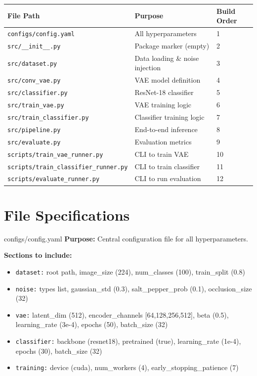 \documentclass[11pt,a4paper]{article}
\begin{document}
\begin{center}
\begin{tabular}{@{}lll@{}}
\toprule
\textbf{File Path} & \textbf{Purpose} & \textbf{Build Order} \\
\midrule
\texttt{configs/config.yaml} & All hyperparameters & 1 \\
\texttt{src/\_\_init\_\_.py} & Package marker (empty) & 2 \\
\texttt{src/dataset.py} & Data loading \& noise injection & 3 \\
\texttt{src/conv\_vae.py} & VAE model definition & 4 \\
\texttt{src/classifier.py} & ResNet-18 classifier & 5 \\
\texttt{src/train\_vae.py} & VAE training logic & 6 \\
\texttt{src/train\_classifier.py} & Classifier training logic & 7 \\
\texttt{src/pipeline.py} & End-to-end inference & 8 \\
\texttt{src/evaluate.py} & Evaluation metrics & 9 \\
\texttt{scripts/train\_vae\_runner.py} & CLI to train VAE & 10 \\
\texttt{scripts/train\_classifier\_runner.py} & CLI to train classifier & 11 \\
\texttt{scripts/evaluate\_runner.py} & CLI to run evaluation & 12 \\
\bottomrule
\end{tabular}
\end{center}

\newpage


\section{File Specifications}

\begin{filebox}{configs/config.yaml}
\textbf{Purpose:} Central configuration file for all hyperparameters.

\textbf{Sections to include:}
\begin{itemize}[noitemsep]
    \item \texttt{dataset:} root path, image\_size (224), num\_classes (100), train\_split (0.8)
    \item \texttt{noise:} types list, gaussian\_std (0.3), salt\_pepper\_prob (0.1), occlusion\_size (32)
    \item \texttt{vae:} latent\_dim (512), encoder\_channels [64,128,256,512], beta (0.5), learning\_rate (3e-4), epochs (50), batch\_size (32)
    \item \texttt{classifier:} backbone (resnet18), pretrained (true), learning\_rate (1e-4), epochs (30), batch\_size (32)
    \item \texttt{training:} device (cuda), num\_workers (4), early\_stopping\_patience (7)
\end{itemize}
\end{filebox}
\end{document}
